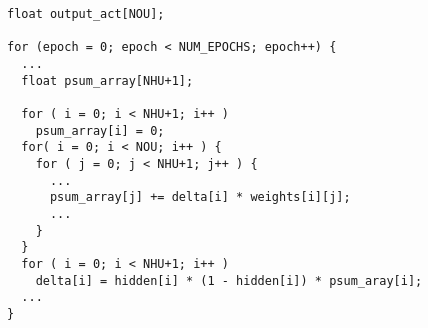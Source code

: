 \begin{lstlisting}[morekeywords={psum_array},belowskip=0pt]
float output_act[NOU];

for (epoch = 0; epoch < NUM_EPOCHS; epoch++) {
  ...
  float psum_array[NHU+1];

  for ( i = 0; i < NHU+1; i++ )
    psum_array[i] = 0;
  for( i = 0; i < NOU; i++ ) {
    for ( j = 0; j < NHU+1; j++ ) {
      ...
      psum_array[j] += delta[i] * weights[i][j];
      ...
    }
  }
  for ( i = 0; i < NHU+1; i++ )
    delta[i] = hidden[i] * (1 - hidden[i]) * psum_aray[i];
  ...
}
\end{lstlisting}
